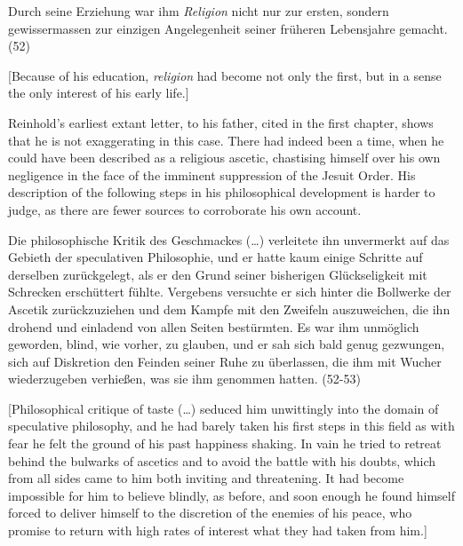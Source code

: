 Durch seine Erziehung war ihm \textit{Religion }nicht nur zur ersten, sondern gewissermassen zur einzigen Angelegenheit seiner fr\"{u}heren Lebensjahre gemacht. (52)

[Because of his education, \textit{religion} had become not only the first, but in a sense the only interest of his early life.]

Reinhold's earliest extant letter, to his father, cited in the first chapter, shows that he is not exaggerating in this case. There had indeed been a time, when he could have been described as a religious ascetic, chastising himself over his own negligence in the face of the imminent suppression of the Jesuit Order. His description of the following steps in his philosophical development is harder to judge, as there are fewer sources to corroborate his own account. 

Die philosophische Kritik des Geschmackes (\ldots ) verleitete ihn unvermerkt auf das Gebieth der speculativen Philosophie, und er hatte kaum einige Schritte auf derselben zur\"{u}ckgelegt, als er den Grund seiner bisherigen Gl\"{u}ckseligkeit mit Schrecken ersch\"{u}ttert f\"{u}hlte. Vergebens versuchte er sich hinter die Bollwerke der Ascetik zur\"{u}ckzuziehen und dem Kampfe mit den Zweifeln auszuweichen, die ihn drohend und einladend von allen Seiten best\"{u}rmten. Es war ihm unm\"{o}glich geworden, blind, wie vorher, zu glauben, und er sah sich bald genug gezwungen, sich auf Diskretion den Feinden seiner Ruhe zu \"{u}berlassen, die ihm mit Wucher wiederzugeben verhie\ss{}en, was sie ihm genommen hatten. (52{-}53)

[Philosophical critique of taste (\ldots ) seduced him unwittingly into the domain of speculative philosophy, and he had barely taken his first steps in this field as with fear he felt the ground of his past happiness shaking. In vain he tried to retreat behind the bulwarks of ascetics and to avoid the battle with his doubts, which from all sides came to him both inviting and threatening. It had become impossible for him to believe blindly, as before, and soon enough he found himself forced to deliver himself to the discretion of the enemies of his peace, who promise to return with high rates of interest what they had taken from him.] 

